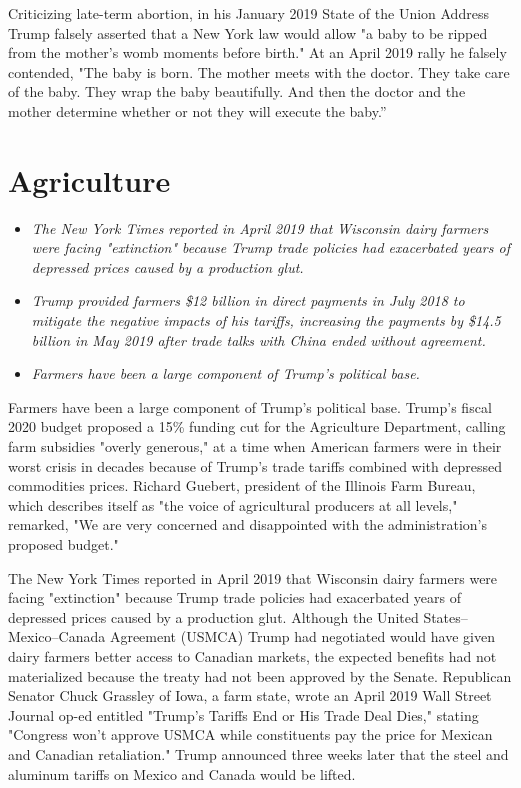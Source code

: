 Criticizing late-term abortion, in his January 2019 State of the Union
Address Trump falsely asserted that a New York law would allow "a baby
to be ripped from the mother's womb moments before birth." At an April
2019 rally he falsely contended, "The baby is born. The mother meets
with the doctor. They take care of the baby. They wrap the baby
beautifully. And then the doctor and the mother determine whether or not
they will execute the baby.''

\section{Agriculture}\label{agriculture}

\begin{itemize}
\item
  \emph{The New York Times reported in April 2019 that Wisconsin dairy
  farmers were facing "extinction" because Trump trade policies had
  exacerbated years of depressed prices caused by a production glut.}
\item
  \emph{Trump provided farmers \$12 billion in direct payments in July
  2018 to mitigate the negative impacts of his tariffs, increasing the
  payments by \$14.5 billion in May 2019 after trade talks with China
  ended without agreement.}
\item
  \emph{Farmers have been a large component of Trump's political base.}
\end{itemize}

Farmers have been a large component of Trump's political base. Trump's
fiscal 2020 budget proposed a 15\% funding cut for the Agriculture
Department, calling farm subsidies "overly generous," at a time when
American farmers were in their worst crisis in decades because of
Trump's trade tariffs combined with depressed commodities prices.
Richard Guebert, president of the Illinois Farm Bureau, which describes
itself as "the voice of agricultural producers at all levels," remarked,
"We are very concerned and disappointed with the administration's
proposed budget."

The New York Times reported in April 2019 that Wisconsin dairy farmers
were facing "extinction" because Trump trade policies had exacerbated
years of depressed prices caused by a production glut. Although the
United States--Mexico--Canada Agreement (USMCA) Trump had negotiated
would have given dairy farmers better access to Canadian markets, the
expected benefits had not materialized because the treaty had not been
approved by the Senate. Republican Senator Chuck Grassley of Iowa, a
farm state, wrote an April 2019 Wall Street Journal op-ed entitled
"Trump's Tariffs End or His Trade Deal Dies," stating "Congress won't
approve USMCA while constituents pay the price for Mexican and Canadian
retaliation." Trump announced three weeks later that the steel and
aluminum tariffs on Mexico and Canada would be lifted.

